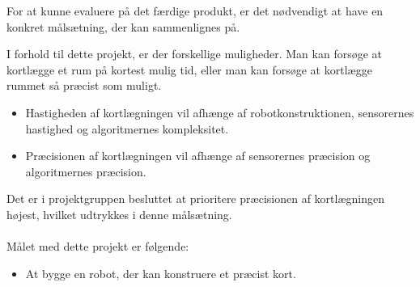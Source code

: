 For at kunne evaluere på det færdige produkt, er det nødvendigt at have en konkret målsætning, der kan sammenlignes på. 

I forhold til dette projekt, er der forskellige muligheder.
Man kan forsøge at kortlægge et rum på kortest mulig tid, eller man kan forsøge at kortlægge rummet så præcist som muligt.

\begin{itemize}
\item Hastigheden af kortlægningen vil afhænge af robotkonstruktionen, sensorernes hastighed og algoritmernes kompleksitet.
\item Præcisionen af kortlægningen vil afhænge af sensorernes præcision og algoritmernes præcision.
\end{itemize}
Det er i projektgruppen besluttet at prioritere præcisionen af kortlægningen højest, hvilket udtrykkes i denne målsætning.

\paragraph{}
\noindent Målet med dette projekt er følgende:
\begin{itemize}
\item At bygge en robot, der kan konstruere et præcist kort.
\end{itemize}
